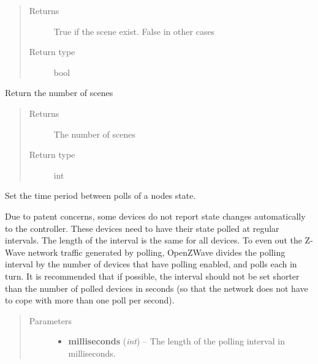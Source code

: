 \documentclass[letterpaper,10pt,english]{sphinxmanual}
\begin{document}
\begin{fulllineitems}
\begin{fulllineitems}
\begin{quote}
\begin{description}
\item[{Returns}] \leavevmode
True if the scene exist. False in other cases

\item[{Return type}] \leavevmode
bool

\end{description}\end{quote}

\end{fulllineitems}


\begin{fulllineitems}
\label{network:openzwave.network.ZWaveNetwork.scenes_count}
Return the number of scenes
\begin{quote}\begin{description}
\item[{Returns}] \leavevmode
The number of scenes

\item[{Return type}] \leavevmode
int

\end{description}\end{quote}

\end{fulllineitems}


\begin{fulllineitems}
\label{network:openzwave.network.ZWaveNetwork.set_poll_interval}
Set the time period between polls of a nodes state.

Due to patent concerns, some devices do not report state changes automatically
to the controller.  These devices need to have their state polled at regular
intervals.  The length of the interval is the same for all devices.  To even
out the Z-Wave network traffic generated by polling, OpenZWave divides the
polling interval by the number of devices that have polling enabled, and polls
each in turn.  It is recommended that if possible, the interval should not be
set shorter than the number of polled devices in seconds (so that the network
does not have to cope with more than one poll per second).
\begin{quote}\begin{description}
\item[{Parameters}] \leavevmode\begin{itemize}
\item {} 
\textbf{milliseconds} (\emph{int}) -- The length of the polling interval in milliseconds.


\end{itemize}
\end{description}
\end{quote}
\end{fulllineitems}
\end{fulllineitems}
\end{document}
